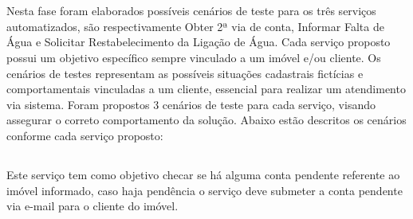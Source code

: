 \section{\fontsize{12}{1} }
Nesta fase foram elaborados possíveis cenários de teste para os três serviços automatizados, são respectivamente Obter 2ª via de conta, Informar Falta de Água e Solicitar Restabelecimento da Ligação de Água. Cada serviço proposto possui um objetivo específico sempre vinculado a um imóvel e/ou cliente.
Os cenários de testes representam as possíveis situações cadastrais fictícias e comportamentais vinculadas a um cliente, essencial para realizar um atendimento via sistema. Foram propostos 3 cenários de teste para cada serviço, visando assegurar o correto comportamento da solução. Abaixo estão descritos os cenários conforme cada serviço proposto:

\subsection{\fontsize{12}{1} }
Este serviço tem como objetivo checar se há alguma conta pendente referente ao imóvel informado, caso haja pendência o serviço deve submeter a conta pendente via e-mail para o cliente do imóvel. 

